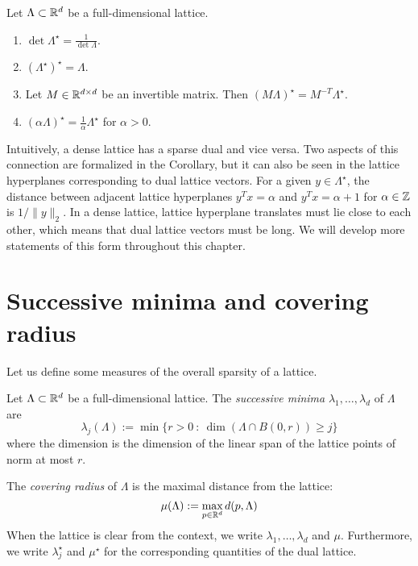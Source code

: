 \begin{corollary}
  \label{corollary:transformed-dual-lattice}
  Let $\Lambda \subset \mathbb{R}^d$ be a full-dimensional lattice.
  \begin{enumerate}
    \item $\det \Lambda^\star = \frac{1}{\det \Lambda}$.

    \item $(\Lambda^\star)^\star = \Lambda$.

    \item Let $M \in \mathbb{R}^{d\times d}$ be an invertible matrix.
      Then $(M \Lambda)^\star = M^{-T} \Lambda^\star$.

    \item $(\alpha \Lambda)^\star = \frac{1}{\alpha} \Lambda^\star$ for $\alpha > 0$.
  \end{enumerate}
\end{corollary}

Intuitively, a dense lattice has a sparse dual and vice versa.
Two aspects of this connection are formalized in the Corollary,
but it can also be seen in the lattice hyperplanes corresponding to dual lattice vectors.
For a given $y \in \Lambda^\star$,
the distance between adjacent lattice hyperplanes $y^Tx = \alpha$ and $y^Tx = \alpha + 1$
for $\alpha \in \mathbb{Z}$ is $1 / \|y\|_2$.
In a dense lattice, lattice hyperplane translates must lie close to each other,
which means that dual lattice vectors must be long.
We will develop more statements of this form throughout this chapter.



\section{Successive minima and covering radius}

Let us define some measures of the overall sparsity of a lattice.

\begin{definition}
  Let $\Lambda \subset \mathbb{R}^d$ be a full-dimensional lattice.
  The \emph{successive minima} $\lambda_1, \ldots, \lambda_d$ of $\Lambda$ are
  \[
    \lambda_j(\Lambda) := \min\{ r > 0 ~:~ \dim( \Lambda \cap B(0,r) ) \geq j \}
  \]
  where the dimension is the dimension of the linear span of the lattice points
  of norm at most $r$.

  The \emph{covering radius} of $\Lambda$ is the maximal distance from the lattice:
  \[
    \mu(\Lambda) := \max_{p \in \mathbb{R}^d} d(p, \Lambda)
  \]
  When the lattice is clear from the context,
  we write $\lambda_1, \ldots, \lambda_d$ and $\mu$.
  Furthermore, we write $\lambda_j^\star$ and $\mu^\star$ for the corresponding
  quantities of the dual lattice.
\end{definition}

